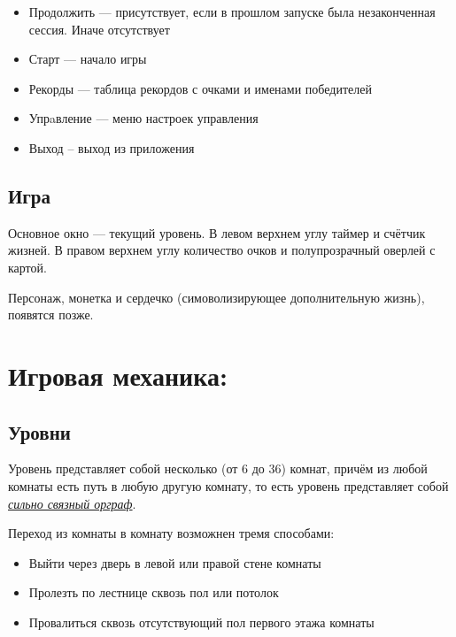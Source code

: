 \documentclass[12pt,a4paper]{article}
\begin{document}
\begin{itemize}
\item Продолжить --- присутствует, если в прошлом запуске была незаконченная сессия. Иначе отсутствует
\item Старт --- начало игры
\item Рекорды --- таблица рекордов с очками и именами победителей
\item Упрaвление --- меню настроек управления
\item Выход -- выход из приложения
\end{itemize}
\subsection{Игра}
\noindent {}

Основное окно --- текущий уровень. В левом верхнем углу таймер и счётчик жизней. В правом верхнем углу количество очков и полупрозрачный оверлей с картой.

Персонаж, монетка и сердечко (симоволизирующее дополнительную жизнь), появятся позже.
\section{Игровая механика:}
\subsection{Уровни}
Уровень представляет собой несколько (от 6 до 36) комнат, причём из любой комнаты есть путь в любую другую комнату, то есть уровень представляет собой \href{http://ru.wikipedia.org/wiki/%
}{\textit{сильно связный орграф}}.

Переход из комнаты в комнату возможнен тремя способами:
\begin{itemize}
\item Выйти через дверь в левой или правой стене комнаты
\item Пролезть по лестнице сквозь пол или потолок
\item Провалиться сквозь отсутствующий пол первого этажа комнаты
\end{itemize}
\end{document}
